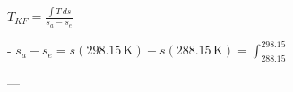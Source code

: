\( T_{KF} = \frac{\int T \, ds}{s_a - s_e} \)  

- \( s_a - s_e = s(298.15 \, \text{K}) - s(288.15 \, \text{K}) = \int_{288.15}^{298.15} \)  

---